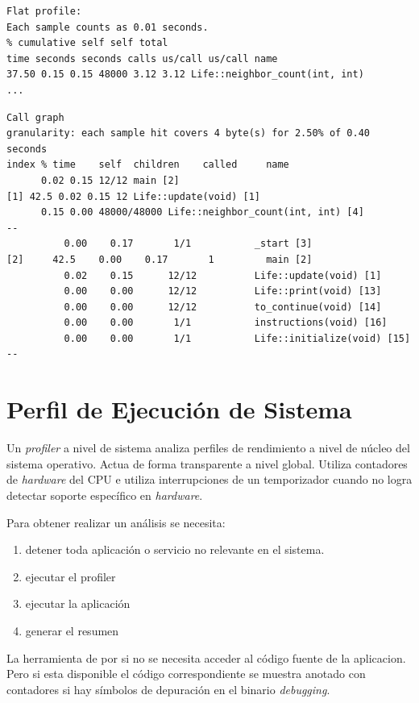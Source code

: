\documentclass[a4paper]{report}
\begin{document}
\begin{lstlisting} 
Flat profile:
Each sample counts as 0.01 seconds.
% cumulative self self total
time seconds seconds calls us/call us/call name
37.50 0.15 0.15 48000 3.12 3.12 Life::neighbor_count(int, int)
...
\end{lstlisting}

\begin{lstlisting} 
Call graph
granularity: each sample hit covers 4 byte(s) for 2.50% of 0.40 seconds
index % time    self  children    called     name
      0.02 0.15 12/12 main [2]
[1] 42.5 0.02 0.15 12 Life::update(void) [1]
      0.15 0.00 48000/48000 Life::neighbor_count(int, int) [4]
--
          0.00    0.17       1/1           _start [3]
[2]     42.5    0.00    0.17       1         main [2]
          0.02    0.15      12/12          Life::update(void) [1]
          0.00    0.00      12/12          Life::print(void) [13]
          0.00    0.00      12/12          to_continue(void) [14]
          0.00    0.00       1/1           instructions(void) [16]
          0.00    0.00       1/1           Life::initialize(void) [15]
--
\end{lstlisting}

\section{Perfil de Ejecuci\'on de Sistema}

Un {\it profiler} a nivel de sistema analiza perfiles de rendimiento a nivel de n\'ucleo del
sistema operativo. Actua de forma transparente a nivel global. Utiliza
contadores de {\it hardware} del CPU e utiliza interrupciones de un temporizador
cuando no logra detectar soporte espec\'ifico en {\it hardware}.

Para obtener realizar un an\'alisis se necesita:

\begin{enumerate}
\item detener toda aplicaci\'on o servicio no relevante en el sistema.
\item ejecutar el profiler
\item ejecutar la aplicaci\'on
\item generar el resumen
\end{enumerate}

La herramienta de por si no se necesita acceder al c\'odigo fuente de la aplicacion.
Pero si esta disponible el c\'odigo correspondiente se muestra anotado con contadores
si hay s\'imbolos de depuraci\'on en el binario {\it debugging}.
\end{document}
